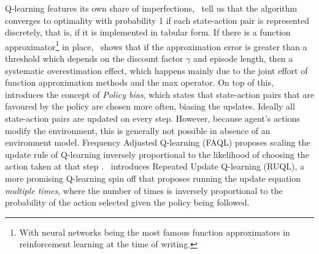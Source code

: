 \documentclass{../main.tex}{subfiles}
\begin{document}
Q-learning features its own share of imperfections,~\cite{Watkins1992} tell us that the algorithm converges to optimality with probability 1 if each state-action pair is represented discretely, that is, if it is implemented in tabular form. If there is a function approximator\footnote{With neural networks being the most famous function approximators in reinforcement learning at the time of writing.} in place,~\cite{Thrun1993} shows that if the approximation error is greater than a threshold which depends on the discount factor $\gamma$ and episode length, then a systematic overestimation effect, which happens mainly due to the joint effort of function approximation methods and the max operator. On top of this,~\cite{Kaisers2010} introduces the concept of \textit{Policy bias}, which states that state-action pairs that are favoured by the policy are chosen more often, biasing the updates. Ideally all state-action pairs are updated on every step. However, because agent's actions modify the environment, this is generally not possible in absence of an environment model. Frequency Adjusted Q-learning (FAQL) proposes scaling the update rule of Q-learning inversely proportional to the likelihood of choosing the action taken at that step \citep{Kaisers2010}.~\cite{Abdallah2016} introduces Repeated Update Q-learning (RUQL), a more promising Q-learning spin off that proposes running the update equation \textit{multiple times}, where the number of times is inversely proportional to the probability of the action selected given the policy being followed.

\end{document}
